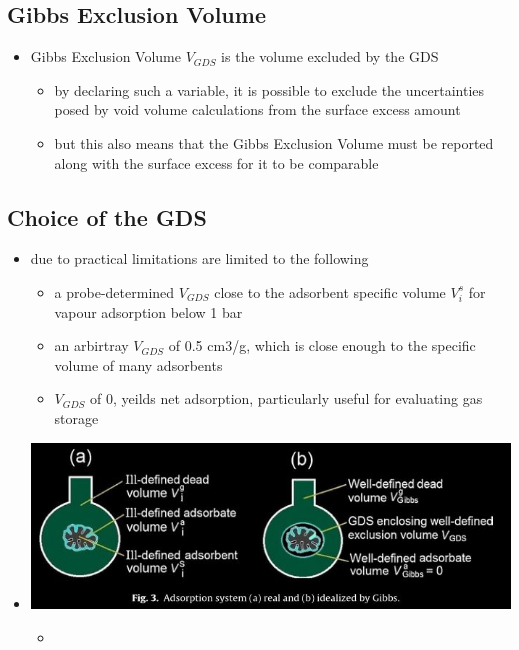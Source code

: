 \documentclass[11pt]{article}
\begin{document}
\subsection{Gibbs Exclusion Volume}
\label{sec:org98bd323}
\begin{itemize}
\item Gibbs Exclusion Volume \(V_{GDS}\) is the volume excluded by the GDS \cite{Rouquerol2016}
\begin{itemize}
\item by declaring such a variable, it is possible to exclude the uncertainties posed by void volume calculations from the surface excess amount
\item but this also means that the Gibbs Exclusion Volume must be reported along with the surface excess for it to be comparable
\end{itemize}
\end{itemize}

\subsection{Choice of the GDS}
\label{sec:org0fa453a}
\begin{itemize}
\item due to practical limitations are limited to the following \cite{Rouquerol2016}
\begin{itemize}
\item a probe-determined \(V_{GDS}\) close to the adsorbent specific volume \(V _i ^s\) for vapour adsorption below 1 bar
\item an arbirtray \(V_{GDS}\) of 0.5 cm3/g, which is close enough to the specific volume of many adsorbents
\item \(V_{GDS}\) of 0, yeilds net adsorption, particularly useful for evaluating gas storage
\end{itemize}
\end{itemize}
\begin{itemize}
\item \begin{center}
\includegraphics[width=.9\linewidth]{./gibbsrepresentation2.jpg}
\end{center}
\begin{itemize}
\item \cite{Rouquerol2016}
\end{itemize}
\end{itemize}
\end{document}
